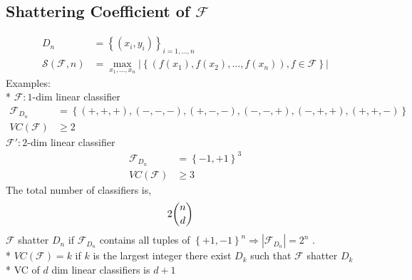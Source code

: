 \documentclass{article}
\begin{document}
\subsection{Shattering Coefficient of $\mathcal{F}$}
\begin{align*}
D_{n} &= \left\{\left(x_{i}, y_{i}\right)\right\}_{i = 1, ..., n}
\\ \mathcal{S}\left(\mathcal{F}, n\right) &= \displaystyle\max_{x_{1}, ..., x_{n}} \left| \left\{\left(f\left(x_{1}\right), f\left(x_{2}\right), ..., f\left(x_{n}\right)\right), f \in \mathcal{F}\right\} \right|
\end{align*}
Examples:
\\* $\mathcal{F}: 1$-dim linear classifier
\begin{align*}
\mathcal{F}_{D_{n}} &= \left\{\left(+, +, +\right), \left(-, -, -\right), \left(+, -, -\right), \left(-, -, +\right), \left(-, +, +\right), \left(+, +, -\right)\right\}
\\ VC  \left(\mathcal{F}\right) &\geq  2
\end{align*}
$\mathcal{F}': 2$-dim linear classifier
\begin{align*}
\mathcal{F}_{D_{n}} &= \left\{-1, +1\right\}^{3}
\\ VC  \left(\mathcal{F}\right) &\geq  3
\end{align*}
The total number of classifiers is,
\begin{align*}
&2 \dbinom{n}{d}
\end{align*}
$\mathcal{F}$ shatter $D_{n}$ if $\mathcal{F}_{D_{n}}$ contains all tuples of $\left\{+1, -1 \right\}^{n} \Rightarrow  | \mathcal{F}_{D_{n}} | = 2^{n}$ .
\\* $VC  \left(\mathcal{F}\right) = k $ if $k $ is the largest integer there exist $D_{k}$ such that $\mathcal{F}$ shatter $D_{k}$
\\* VC of $d $ dim linear classifiers is $d  + 1$
\end{document}
